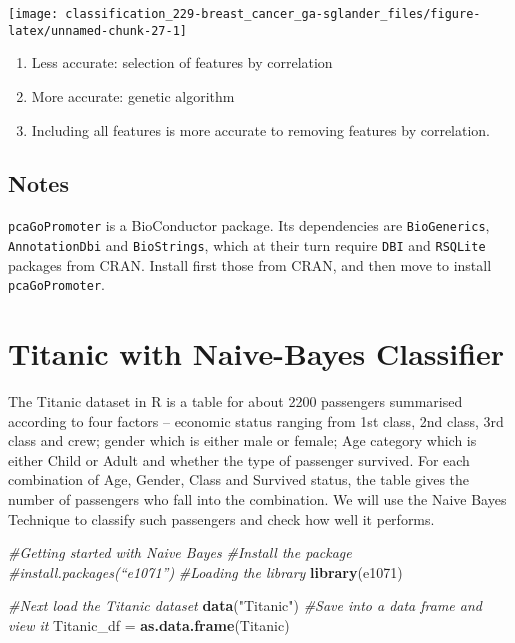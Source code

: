 \documentclass[]{book}
\newenvironment{Shaded}{\begin{snugshade}}{\end{snugshade}}
\newcommand{\CommentTok}[1]{\textcolor[rgb]{0.56,0.35,0.01}{\textit{#1}}}
\newcommand{\KeywordTok}[1]{\textcolor[rgb]{0.13,0.29,0.53}{\textbf{#1}}}
\newcommand{\NormalTok}[1]{#1}
\newcommand{\StringTok}[1]{\textcolor[rgb]{0.31,0.60,0.02}{#1}}
\providecommand{\tightlist}{%
  \setlength{\itemsep}{0pt}\setlength{\parskip}{0pt}}
\begin{document}
\begin{center}\texttt{[image: classification\_229-breast\_cancer\_ga-sglander\_files/figure-latex/unnamed-chunk-27-1]} \end{center}

\begin{enumerate}
\def\labelenumi{\arabic{enumi}.}
\tightlist
\item
  Less accurate: selection of features by correlation
\item
  More accurate: genetic algorithm
\item
  Including all features is more accurate to removing features by correlation.
\end{enumerate}

\hypertarget{notes}{%
\section{Notes}\label{notes}}

\texttt{pcaGoPromoter} is a BioConductor package. Its dependencies are \texttt{BioGenerics}, \texttt{AnnotationDbi} and \texttt{BioStrings}, which at their turn require \texttt{DBI} and \texttt{RSQLite} packages from CRAN. Install first those from CRAN, and then move to install \texttt{pcaGoPromoter}.

\hypertarget{titanic-with-naive-bayes-classifier}{%
\chapter{Titanic with Naive-Bayes Classifier}\label{titanic-with-naive-bayes-classifier}}

The Titanic dataset in R is a table for about 2200 passengers summarised according to four factors -- economic status ranging from 1st class, 2nd class, 3rd class and crew; gender which is either male or female; Age category which is either Child or Adult and whether the type of passenger survived. For each combination of Age, Gender, Class and Survived status, the table gives the number of passengers who fall into the combination. We will use the Naive Bayes Technique to classify such passengers and check how well it performs.

\begin{Shaded}
\begin{Highlighting}[]
\CommentTok{#Getting started with Naive Bayes}
\CommentTok{#Install the package}
\CommentTok{#install.packages(“e1071”)}
\CommentTok{#Loading the library}
\KeywordTok{library}\NormalTok{(e1071)}

\CommentTok{#Next load the Titanic dataset}
\KeywordTok{data}\NormalTok{(}\StringTok{"Titanic"}\NormalTok{)}
\CommentTok{#Save into a data frame and view it}
\NormalTok{Titanic_df =}\StringTok{ }\KeywordTok{as.data.frame}\NormalTok{(Titanic)}
\end{Highlighting}
\end{Shaded}
\end{document}
